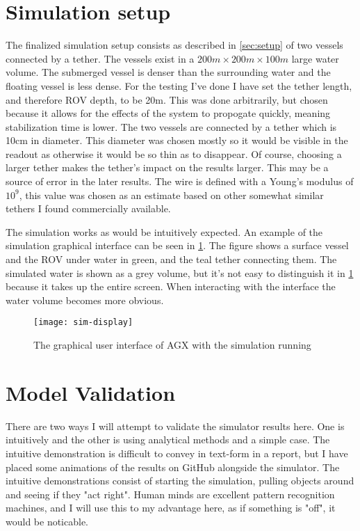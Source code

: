 \section{Simulation setup}
The finalized simulation setup consists as described in \cref{sec:setup} of two vessels connected by a tether. The vessels exist in a \(200m\times 200m\times 100m\) large water volume. The submerged vessel is denser than the surrounding water and the floating vessel is less dense. For the testing I've done I have set the tether length, and therefore ROV depth, to be 20m. This was done arbitrarily, but chosen because it allows for the effects of the system to propogate quickly, meaning stabilization time is lower. The two vessels are connected by a tether which is 10cm in diameter. This diameter was chosen mostly so it would be visible in the readout as otherwise it would be so thin as to disappear. Of course, choosing a larger tether makes the tether's impact on the results larger. This may be a source of error in the later results. The wire is defined with a Young's modulus of \(10^9\), this value was chosen as an estimate based on other somewhat similar tethers I found commercially available. 

The simulation works as would be intuitively expected. An example of the simulation graphical interface can be seen in \cref{fig:sim-display}. The figure shows a surface vessel and the ROV under water in green, and the teal tether connecting them. The simulated water is shown as a grey volume, but it's not easy to distinguish it in \cref{fig:sim-display} because it takes up the entire screen. When interacting with the interface the water volume becomes more obvious. 

\begin{figure}
	\centering
	\texttt{[image: sim-display]}
	\caption{The graphical user interface of AGX with the simulation running}
	\label{fig:sim-display}
\end{figure}

\section{Model Validation}
\label{sec:validation}
There are two ways I will attempt to validate the simulator results here. One is intuitively and the other is using analytical methods and a simple case. The intuitive demonstration is difficult to convey in text-form in a report, but I have placed some animations of the results on GitHub\cite{noauthor_fordypogmastersimulator_nodate} alongside the simulator. The intuitive demonstrations consist of starting the simulation, pulling objects around and seeing if they "act right". Human minds are excellent pattern recognition machines, and I will use this to my advantage here, as if something is "off", it would be noticable. 

